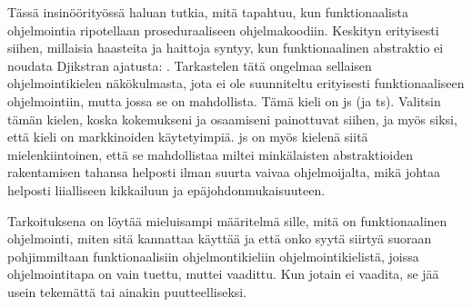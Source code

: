 Tässä insinöörityössä haluan tutkia, mitä tapahtuu, kun funktionaalista ohjelmointia ripotellaan proseduraaliseen ohjelmakoodiin. Keskityn erityisesti siihen, millaisia haasteita ja haittoja syntyy, kun funktionaalinen abstraktio ei noudata Djikstran ajatusta:  \cite{dijkstra_humble_programmer}. Tarkastelen tätä ongelmaa sellaisen ohjelmointikielen näkökulmasta, jota ei ole suunniteltu erityisesti funktionaaliseen ohjelmointiin, mutta jossa se on mahdollista. Tämä kieli on \gls{js} (ja \gls{ts}). Valitsin tämän kielen, koska kokemukseni ja osaamiseni painottuvat siihen, ja myös siksi, että kieli on markkinoiden käytetyimpiä. \Gls{js} on myös kielenä siitä mielenkiintoinen, että se mahdollistaa miltei minkälaisten abstraktioiden rakentamisen tahansa helposti ilman suurta vaivaa ohjelmoijalta, mikä johtaa helposti liialliseen kikkailuun ja epäjohdonmukaisuuteen.

Tarkoituksena on löytää mieluisampi määritelmä sille, mitä on funktionaalinen ohjelmointi, miten sitä kannattaa käyttää ja että onko syytä siirtyä suoraan pohjimmiltaan funktionaalisiin ohjelmontikieliin ohjelmointikielistä, joissa ohjelmointitapa on vain tuettu, muttei vaadittu. Kun jotain ei vaadita, se jää usein tekemättä tai ainakin puutteelliseksi.

